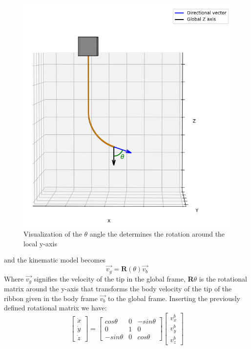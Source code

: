 \begin{figure} [H]
    \centering
    \includegraphics[width=0.55\linewidth]{images/pythonpictures/Capture.PNG}
    \caption{Visualization of the $\theta$ angle the determines the rotation around the local y-axis}
    \label{fig:theta}
\end{figure}
and the kinematic model becomes
\begin{equation}
    \vec{v_g} = \textbf{R}(\theta) \vec{v_b}
\end{equation}
Where $\vec{v_g}$ signifies the velocity of the tip in the global frame, \textbf{R}$\theta$ is the rotational matrix around the y-axis that transforms the body velocity of the tip of the ribbon given in the body frame $\vec{v_b}$ to the global frame. Inserting the previously defined rotational matrix we have:
\begin{equation}
    \begin{bmatrix}
        \dot{x}\\ \dot{y}\\ \dot{z}
    \end{bmatrix} = 
    \begin{bmatrix}
        cos \theta   &   0   &   -sin \theta \\
        0            &   1   &   0\\
       -sin \theta   &   0   &   cos \theta
    \end{bmatrix}
    \begin{bmatrix}
        v_x^b \\ v_y^b \\ v_z^b
    \end{bmatrix}
\end{equation}

